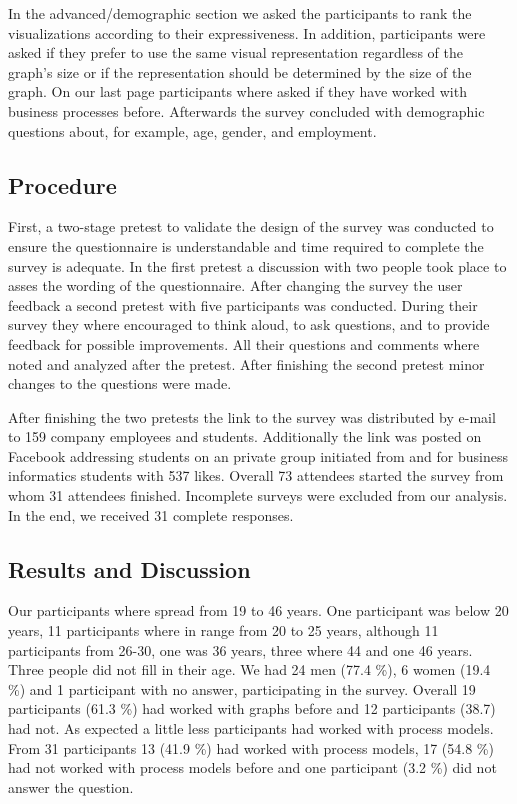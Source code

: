 \documentclass{llncs}
\begin{document}
In the advanced/demographic section we asked the participants to rank the visualizations according to their expressiveness. In addition, participants were asked if they prefer to use the same visual representation regardless of the graph's size or if the representation should be determined by the size of the graph. On our last page participants where asked if they have worked with business processes before. Afterwards the survey concluded with demographic questions about, for example, age, gender, and employment. 

\subsection{Procedure} %
\label{sec:Procedure}

First, a two-stage pretest to validate the design of the survey was conducted to ensure the questionnaire is understandable and time required to complete the survey is adequate. In the first pretest a discussion with two people took place to asses the wording of the questionnaire. After changing the survey the user feedback a second pretest with five participants was conducted. During their survey they where encouraged to think aloud, to ask questions, and to provide feedback for possible improvements. All their questions and comments where noted and analyzed after the pretest. After finishing the second pretest minor changes to the questions were made. 

After finishing the two pretests the link to the survey was distributed by e-mail to 159 company employees and students. Additionally the link was posted on Facebook addressing students on an private group initiated from and for business informatics students with 537 likes. Overall 73 attendees started the survey from whom 31 attendees finished. Incomplete surveys were excluded from our analysis. In the end, we received 31 complete responses.

\subsection{Results and Discussion} %
\label{sec:Results}

Our participants where spread  from 19 to 46 years. One participant was below 20 years, 11 participants where in range from 20 to 25 years, although 11 participants from 26-30, one was 36 years, three where 44 and one 46 years. Three people did not fill in their age. We had 24 men (77.4 \%), 6 women (19.4 \%) and 1 participant with no answer, participating in the survey. Overall 19 participants (61.3 \%) had worked with graphs before and 12 participants (38.7) had not. As expected a little less participants had worked with process models. From 31 participants 13 (41.9 \%) had worked with process models, 17 (54.8 \%) had not worked with process models before and one participant (3.2 \%) did not answer the question.
\end{document}
